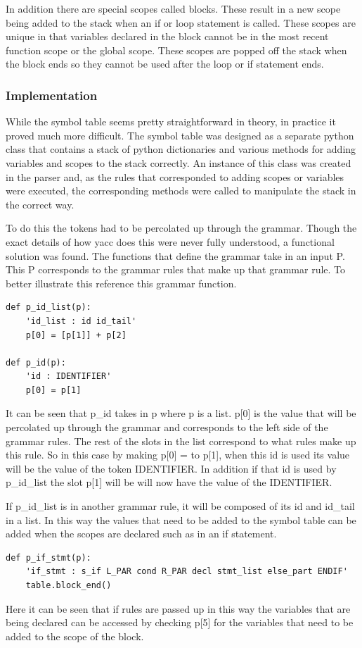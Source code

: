 \documentclass[12pt, oneside]{article}   	%
\begin{document}
In addition there are special scopes called blocks. These result in a new scope being added to the stack when an if or loop statement is called. These scopes are unique in that variables declared in the block cannot be in the most recent function scope or the global scope. These scopes are popped off the stack when the block ends so they cannot be used after the loop or if statement ends.
\subsubsection{Implementation}
While the symbol table seems pretty straightforward in theory, in practice it proved much more difficult. The symbol table was designed as a separate python class that contains a stack of python dictionaries and various methods for adding variables and scopes to the stack correctly. An instance of this class was created in the parser and, as the rules that corresponded to adding scopes or variables were executed, the corresponding methods were called to manipulate the stack in the correct way. 

To do this the tokens had to be percolated up through the grammar. Though the exact details of how yacc does this were never fully understood, a functional solution was found.  The functions that define the grammar take in an input P. This P corresponds to the grammar rules that make up that grammar rule. To better illustrate this reference this grammar function.
\begin{lstlisting}
def p_id_list(p):
	'id_list : id id_tail'
	p[0] = [p[1]] + p[2]
	
def p_id(p):
	'id : IDENTIFIER'
	p[0] = p[1]
\end{lstlisting}
It can be seen that p\_id takes in p where p is a list. p[0] is the value that will be percolated up through the grammar and corresponds to the left side of the grammar rules. The rest of the slots in the list correspond to what rules make up this rule. So in this case by making p[0] = to p[1], when this id is used its value will be the value of the token IDENTIFIER. In addition if that id is used by p\_id\_list the slot p[1] will be will now have the value of the IDENTIFIER. 

If p\_id\_list is in another grammar rule, it will be composed of its id and id\_tail in a list. In this way the values that need to be added to the symbol table can be added when the scopes are declared such as in an if statement. 
\begin{lstlisting}
def p_if_stmt(p):
	'if_stmt : s_if L_PAR cond R_PAR decl stmt_list else_part ENDIF'
	table.block_end()
\end{lstlisting}
	Here it can be seen that if rules are passed up in this way the variables that are being declared can be accessed by checking p[5] for the variables that need to be added to the scope of the block.
\end{document}
